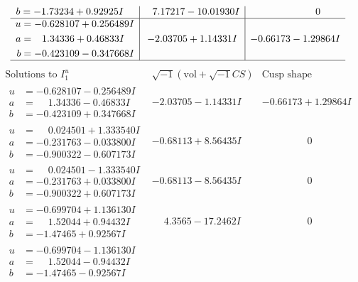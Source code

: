 \documentclass[1p]{elsarticle_modified}
\theoremstyle{definition}
\newcommand{\I}{\sqrt{-1}}
\begin{document}
$$\begin{array}{c|c|c}
\begin{aligned}
b &= -1.73234 + 0.92925 I\end{aligned}
 & \phantom{-}7.17217 - 10.01930 I & \phantom{-0.000000 } 0 \\ \hline\begin{aligned}
u &= -0.628107 + 0.256489 I \\
a &= \phantom{-}1.34336 + 0.46833 I \\
b &= -0.423109 - 0.347668 I\end{aligned}
 & -2.03705 + 1.14331 I & -0.66173 - 1.29864 I\\
 \hline 
 \end{array}$$\newpage$$\begin{array}{c|c|c}  
\text{Solutions to }I^u_{1}& \I (\text{vol} + \sqrt{-1}CS) & \text{Cusp shape}\\
 \hline 
\begin{aligned}
u &= -0.628107 - 0.256489 I \\
a &= \phantom{-}1.34336 - 0.46833 I \\
b &= -0.423109 + 0.347668 I\end{aligned}
 & -2.03705 - 1.14331 I & -0.66173 + 1.29864 I \\ \hline\begin{aligned}
u &= \phantom{-}0.024501 + 1.333540 I \\
a &= -0.231763 - 0.033800 I \\
b &= -0.900322 - 0.607173 I\end{aligned}
 & -0.68113 + 8.56435 I & \phantom{-0.000000 } 0 \\ \hline\begin{aligned}
u &= \phantom{-}0.024501 - 1.333540 I \\
a &= -0.231763 + 0.033800 I \\
b &= -0.900322 + 0.607173 I\end{aligned}
 & -0.68113 - 8.56435 I & \phantom{-0.000000 } 0 \\ \hline\begin{aligned}
u &= -0.699704 + 1.136130 I \\
a &= \phantom{-}1.52044 + 0.94432 I \\
b &= -1.47465 + 0.92567 I\end{aligned}
 & \phantom{-}4.3565 - 17.2462 I & \phantom{-0.000000 } 0 \\ \hline\begin{aligned}
u &= -0.699704 - 1.136130 I \\
a &= \phantom{-}1.52044 - 0.94432 I \\
b &= -1.47465 - 0.92567 I\end{aligned}

\end{array}$$
\end{document}
